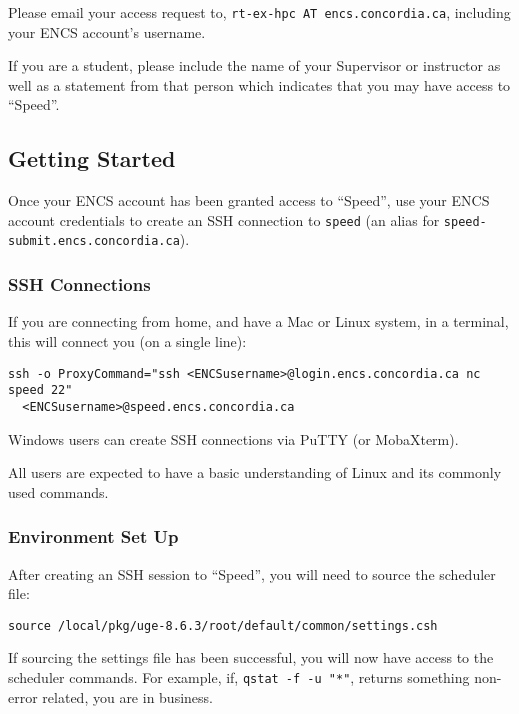 \documentclass{easychair}
\begin{document}
Please email your access request to, \texttt{rt-ex-hpc AT encs.concordia.ca}, 
including your ENCS account's username.

If you are a student, please include the name of your Supervisor or instructor
as well as a statement from that person which indicates that you may have
access to ``Speed''.

\subsection{Getting Started}

Once your ENCS account has been granted access to ``Speed'',
use your ENCS account credentials to create an SSH connection to 
\texttt{speed} (an alias for \texttt{speed-submit.encs.concordia.ca}). 

\subsubsection{SSH Connections}
If you are connecting from home, and have a Mac or Linux system, in a
terminal, this will connect you (on a single line):

\begin{verbatim}
ssh -o ProxyCommand="ssh <ENCSusername>@login.encs.concordia.ca nc speed 22"
  <ENCSusername>@speed.encs.concordia.ca
\end{verbatim}

Windows users can create SSH connections via PuTTY (or MobaXterm). 

All users are expected to have a basic understanding of Linux and its 
commonly used commands.

\subsubsection{Environment Set Up}
\label{envsetup}
After creating an SSH session to ``Speed'', you will need to source the scheduler file:

\begin{verbatim}
source /local/pkg/uge-8.6.3/root/default/common/settings.csh 
\end{verbatim}

If sourcing the settings file has been successful, you will now have access to 
the scheduler commands. 
For example, if, \texttt{qstat -f -u "*"}, returns something non-error related, 
you are in business. 
\end{document}
